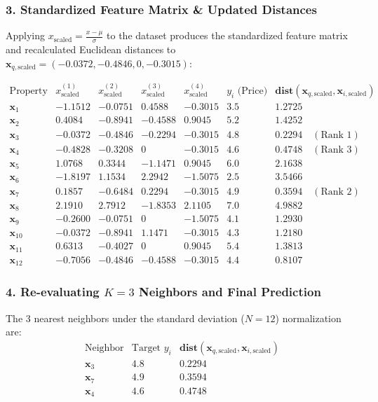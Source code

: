 \documentclass[12pt]{article}
\newcommand{\MVec}[1]{\mathbf{#1}}
\begin{document}
\subsubsection*{3. Standardized Feature Matrix \& Updated Distances}
Applying $x_{\text{scaled}} = \frac{x - \mu}{\sigma}$ to the dataset produces the standardized feature matrix and recalculated Euclidean distances to $\MVec{x}_{q,\text{scaled}} = (-0.0372, -0.4846, 0, -0.3015)$:

\[
    \begin{array}{c|cccc|c|c}
        \text{Property} &
            x_{\text{scaled}}^{(1)} &
            x_{\text{scaled}}^{(2)} &
            x_{\text{scaled}}^{(3)} &
            x_{\text{scaled}}^{(4)} &
            y_i \text{ (Price)} &
            \mathbf{dist}(\MVec{x}_{q,\text{scaled}}, \MVec{x}_{i,\text{scaled}}) \\ \hline
        \MVec{x}_1 & -1.1512 & -0.0751 & 0.4588  & -0.3015 & 3.5 & 1.2725 \\
        \MVec{x}_2 & 0.4084  & -0.8941 & -0.4588 & 0.9045  & 5.2 & 1.4252 \\
        \MVec{x}_3 & -0.0372 & -0.4846 & -0.2294 & -0.3015 & 4.8 & \mathbf{0.2294} \quad (\text{Rank } 1) \\
        \MVec{x}_4 & -0.4828 & -0.3208 & 0       & -0.3015 & 4.6 & \mathbf{0.4748} \quad (\text{Rank } 3) \\
        \MVec{x}_5 & 1.0768  & 0.3344  & -1.1471 & 0.9045  & 6.0 & 2.1638 \\
        \MVec{x}_6 & -1.8197 & 1.1534  & 2.2942  & -1.5075 & 2.5 & 3.5466 \\
        \MVec{x}_7 & 0.1857  & -0.6484 & 0.2294  & -0.3015 & 4.9 & \mathbf{0.3594} \quad (\text{Rank } 2) \\
        \MVec{x}_8 & 2.1910  & 2.7912  & -1.8353 & 2.1105  & 7.0 & 4.9882 \\
        \MVec{x}_9 & -0.2600 & -0.0751 & 0       & -1.5075 & 4.1 & 1.2930 \\
        \MVec{x}_{10}& -0.0372 & -0.8941 & 1.1471  & -0.3015 & 4.3 & 1.2180 \\
        \MVec{x}_{11}& 0.6313  & -0.4027 & 0       & 0.9045  & 5.4 & 1.3813 \\
        \MVec{x}_{12}& -0.7056 & -0.4846 & -0.4588 & -0.3015 & 4.4 & 0.8107
    \end{array}
\]

\subsubsection*{4. Re-evaluating $K=3$ Neighbors and Final Prediction}
The 3 nearest neighbors under the standard deviation ($N=12$) normalization are:
\[
    \begin{array}{c|c|c}
        \text{Neighbor} & \text{Target } y_i & \mathbf{dist}(\MVec{x}_{q,\text{scaled}}, \MVec{x}_{i,\text{scaled}}) \\ \hline
        \MVec{x}_3 & 4.8 & 0.2294 \\
        \MVec{x}_7 & 4.9 & 0.3594 \\
        \MVec{x}_4 & 4.6 & 0.4748
    \end{array}
\]
\end{document}
